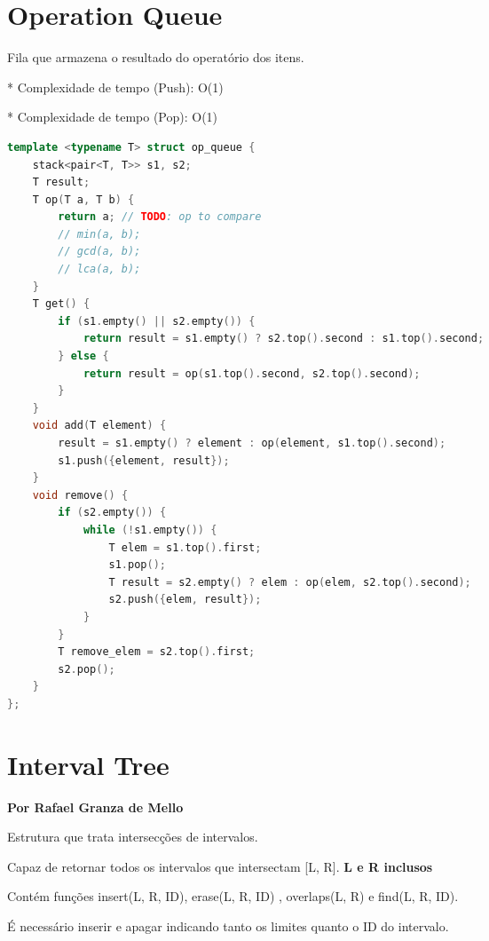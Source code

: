 \documentclass[11pt, a4paper, oneside]{book}
\begin{document}
\hfill

\section{Operation Queue}


Fila que armazena o resultado do operatório dos itens.



* Complexidade de tempo (Push): O(1)

* Complexidade de tempo (Pop): O(1)

\hfill

\begin{multicols}{2}
\begin{lstlisting}[language=C++]
template <typename T> struct op_queue {
    stack<pair<T, T>> s1, s2;
    T result;
    T op(T a, T b) {
        return a; // TODO: op to compare
        // min(a, b);
        // gcd(a, b);
        // lca(a, b);
    }
    T get() {
        if (s1.empty() || s2.empty()) {
            return result = s1.empty() ? s2.top().second : s1.top().second;
        } else {
            return result = op(s1.top().second, s2.top().second);
        }
    }
    void add(T element) {
        result = s1.empty() ? element : op(element, s1.top().second);
        s1.push({element, result});
    }
    void remove() {
        if (s2.empty()) {
            while (!s1.empty()) {
                T elem = s1.top().first;
                s1.pop();
                T result = s2.empty() ? elem : op(elem, s2.top().second);
                s2.push({elem, result});
            }
        }
        T remove_elem = s2.top().first;
        s2.pop();
    }
};
\end{lstlisting}
\end{multicols}

\hfill

\section{Interval Tree}
\textbf{Por Rafael Granza de Mello}



Estrutura que trata intersecções de intervalos.



Capaz de retornar todos os intervalos que intersectam [L, R]. \textbf{L e R inclusos}  

Contém funções insert({L, R, ID}), erase({L, R, ID}) , overlaps(L, R) e find({L, R, ID}).  

É necessário inserir e apagar indicando tanto os limites quanto o ID do intervalo.
\end{document}
